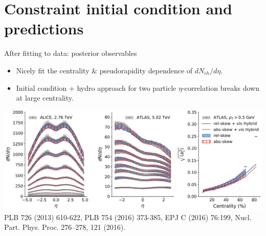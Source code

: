 \documentclass[11pt]{beamer}
\begin{document}
\section{Constraint initial condition and predictions}
\begin{frame}{After fitting to data: posterior observables}
\begin{itemize}
\item Nicely fit the centrality $\&$ pseudorapidity dependence of $dN_{ch}/d\eta$.
\item  Initial condition + hydro approach for two particle $\eta$-correlation breaks down at large centrality.
\end{itemize}
\begin{center}
\includegraphics[width=\textwidth]{post_obs.pdf}\\
\tiny  	PLB 726 (2013) 610-622, PLB 754 (2016) 373-385, EPJ C (2016) 76:199, Nucl. Part. Phys. Proc. 276–278, 121 (2016).
\end{center}
\end{frame}
\end{document}
